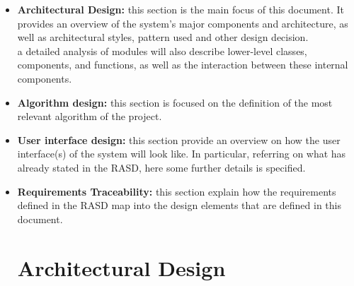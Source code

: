 \documentclass[10pt,a4paper]{report}
\begin{document}
\begin{itemize}
\item{\textbf{Architectural Design:}} this section is the main focus of this document. It provides an overview of the system's major components and architecture, as well as architectural styles, pattern used and other design decision.\\

a detailed analysis of modules will also describe lower-level classes, components, and functions, as well as the interaction between these internal components.\\

\item{\textbf{Algorithm design:}} this section is focused on the definition of the most relevant algorithm of the project.

\item{\textbf{User interface design:}} this section provide an overview on how the user interface(s) of the system will look like. In particular, referring on what has already stated in the RASD, here some further details is specified.

\item{\textbf{Requirements Traceability:}} this section explain how the requirements defined in the RASD map into the design elements that are defined in this document.
\chapter{Architectural Design}
\end{itemize}
\end{document}
